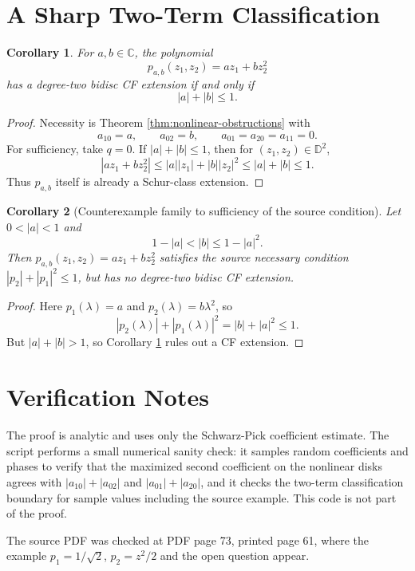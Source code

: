 \documentclass[11pt]{article}
\newtheorem{corollary}{Corollary}
\begin{document}
\section*{A Sharp Two-Term Classification}

\begin{corollary}\label{cor:two-term}
For \(a,b\in\mathbb C\), the polynomial
\[
p_{a,b}(z_1,z_2)=a z_1+b z_2^2
\]
has a degree-two bidisc CF extension if and only if
\[
|a|+|b|\le 1.
\]
\end{corollary}

\begin{proof}
Necessity is Theorem \ref{thm:nonlinear-obstructions} with
\[
a_{10}=a,\qquad a_{02}=b,\qquad a_{01}=a_{20}=a_{11}=0.
\]
For sufficiency, take \(q=0\).  If \(|a|+|b|\le 1\), then for
\((z_1,z_2)\in\mathbb D^2\),
\[
|a z_1+b z_2^2|
\le |a||z_1|+|b||z_2|^2
\le |a|+|b|
\le 1.
\]
Thus \(p_{a,b}\) itself is already a Schur-class extension.
\end{proof}

\begin{corollary}[Counterexample family to sufficiency of the source condition]
Let \(0<|a|<1\) and
\[
1-|a|<|b|\le 1-|a|^2.
\]
Then \(p_{a,b}(z_1,z_2)=a z_1+b z_2^2\) satisfies the source necessary
condition \(|p_2|+|p_1|^2\le 1\), but has no degree-two bidisc CF extension.
\end{corollary}

\begin{proof}
Here \(p_1(\lambda)=a\) and \(p_2(\lambda)=b\lambda^2\), so
\[
|p_2(\lambda)|+|p_1(\lambda)|^2=|b|+|a|^2\le 1.
\]
But \(|a|+|b|>1\), so Corollary \ref{cor:two-term} rules out a CF extension.
\end{proof}

\section*{Verification Notes}

The proof is analytic and uses only the Schwarz-Pick coefficient estimate.
The script  performs a small numerical
sanity check: it samples random coefficients and phases to verify that the
maximized second coefficient on the nonlinear disks agrees with
\(|a_{10}|+|a_{02}|\) and \(|a_{01}|+|a_{20}|\), and it checks the two-term
classification boundary for sample values including the source example.
This code is not part of the proof.

The source PDF was checked at PDF page 73, printed page 61, where the example
\(p_1=1/\sqrt2\), \(p_2=z^2/2\) and the open question appear.
\end{document}
